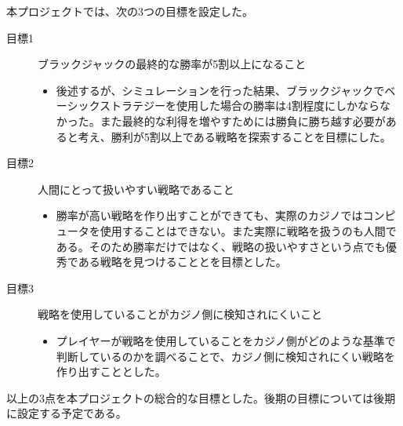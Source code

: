 本プロジェクトでは、次の3つの目標を設定した。
\begin{description}
\item[目標1] ブラックジャックの最終的な勝率が5割以上になること
\begin{itemize}
\item{後述するが、シミュレーションを行った結果、ブラックジャックでベーシックストラテジーを使用した場合の勝率は4割程度にしかならなかった。また最終的な利得を増やすためには勝負に勝ち越す必要があると考え、勝利が5割以上である戦略を探索することを目標にした。}
\end{itemize}
\item[目標2] 人間にとって扱いやすい戦略であること
\begin{itemize}
\item{勝率が高い戦略を作り出すことができても、実際のカジノではコンピュータを使用することはできない。また実際に戦略を扱うのも人間である。そのため勝率だけではなく、戦略の扱いやすさという点でも優秀である戦略を見つけることとを目標とした。}
\end{itemize}
\item[目標3] 戦略を使用していることがカジノ側に検知されにくいこと
\begin{itemize}
\item{プレイヤーが戦略を使用していることをカジノ側がどのような基準で判断しているのかを調べることで、カジノ側に検知されにくい戦略を作り出すこととした。}
\end{itemize}
\end{description}
以上の3点を本プロジェクトの総合的な目標とした。後期の目標については後期に設定する予定である。
